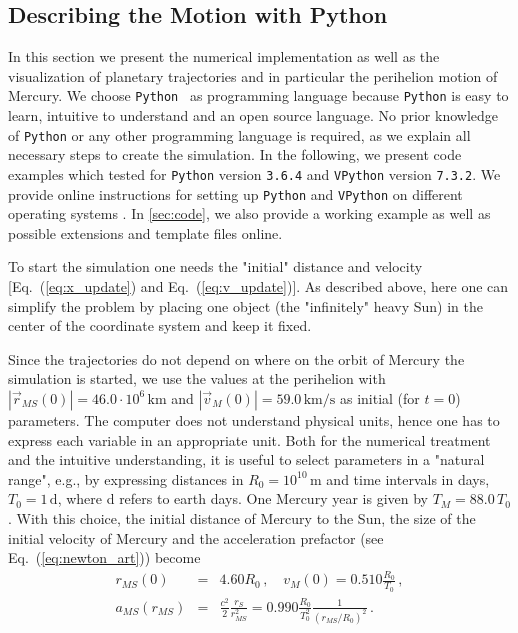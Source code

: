 \documentclass[12pt,ngerman,american]{iopart}
\newcommand{\python}[0]{\texttt{Python}}
\newcommand{\vpython}[0]{\texttt{VPython}}
\newcommand{\abs}[1]{\left\vert #1 \right\vert}
\begin{document}
\subsection{Describing the Motion with Python}

In this section we present the numerical implementation as well as the visualization of planetary trajectories and in
particular the perihelion motion of Mercury.
We choose \python{}~\cite{Python} as programming language because \python{} is easy to learn, intuitive to understand and an open source language.
No prior knowledge of \python{} or any other programming language is required, as we explain all necessary steps to create the simulation.
In the following, we present code examples which tested for \python{} version \texttt{3.6.4} and \vpython{} version \texttt{7.3.2}.
We provide online instructions for setting up \python{} and \vpython{} on different operating systems \cite{scripts}.
In \ref{sec:code}, we also provide a working example as well as possible extensions and template files online.

To start the simulation one needs the "initial" distance and velocity [Eq.~(\ref{eq:x_update}) and Eq.~(\ref{eq:v_update})].
As described above, here one can simplify the problem by placing one object (the "infinitely" heavy Sun) in the center of the coordinate system and keep it fixed.

Since the trajectories do not depend on where on the orbit of Mercury the simulation is started, we
use the values at the perihelion with $\abs{\vec r_{MS}(0)} = 46.0 \cdot 10^6\,\mathrm{km}$ and $\abs{\vec v_M(0)} = 59.0\,\mathrm{km/s}$\cite{MercuryFactSheet} as initial (for $t=0$) parameters.
The computer does not understand physical units, hence one has to express each variable in an appropriate unit.
Both for the numerical treatment and the intuitive understanding, it is useful to select parameters in a "natural range", e.g.,
by expressing distances in $R_0 = 10^{10}\,\mathrm{m}$ and time intervals in days, $T_0 = 1\,\mathrm{d}$, where d refers to earth days. One Mercury year is given by $T_M=88.0\,T_0$.
With this choice, the initial distance of Mercury to the Sun, the size of the initial velocity of Mercury and the acceleration prefactor (see Eq.~(\ref{eq:newton_art})) become
\begin{eqnarray}
r_{MS}(0)   &=& 4.60 R_0 \, , \quad
v_{M}(0)    = 0.510 \frac{R_0}{T_0} \, ,  \\
a_{MS}(r_{MS}) &=& \frac{c^2}{2}\frac{r_S}{r_{MS}^2} = 0.990 \frac{R_0}{T_0^2} \frac{1}{{\left(r_{MS}/R_0\right)}^2}\, .
\end{eqnarray}
\end{document}
